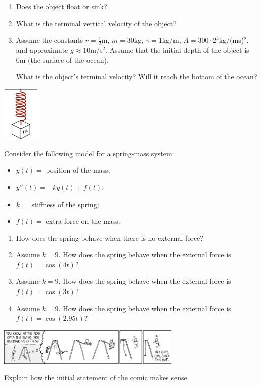 \begin{exercises}
\begin{problist}
	\begin{enumerate}
		\item Does the object float or sink? 
		\item What is the terminal vertical velocity of the object?
		\item Assume the constants $r=\frac12$m, $m=30$kg, $\gamma =1$kg/m, $A=300 \cdot 2^3$kg/(ms)$^2$, and approximate $g\approx 10$m/s$^2$. Assume that the initial depth of the object is 0m (the surface of the ocean). 
			
			What is the object's terminal velocity?
			Will it reach the bottom of the ocean?
	\end{enumerate}
	
	
	\begin{center}
		\includegraphics*[width=50pt]{images/module22-spring-mass.pdf}
	\end{center}

	
	\prob Consider the following model for a spring-mass system:
	\begin{itemize}
		\item $y(t) = $ position of the mass;
		\item $y''(t)  = -ky(t) + f(t)$;
		\item $k=$ stiffness of the spring;
		\item $f(t)=$ extra force on the mass.
	\end{itemize}

	\begin{enumerate}
		\item How does the spring behave when there is no external force?
		\item Assume $k=9$. How does the spring behave when the external force is $f(t)=\cos(4t)$?
		\item Assume $k=9$. How does the spring behave when the external force is $f(t)=\cos(3t)$?
		\item Assume $k=9$. How does the spring behave when the external force is $f(t)=\cos(2.95t)$?
	\end{enumerate}
	
	
	\hspace{-1cm}\includegraphics*[width=250pt]{images/chap4-xkcd.png}
	

	
	\prob Explain how the initial statement of the comic makes sense.
		
	\end{problist}
\end{exercises}